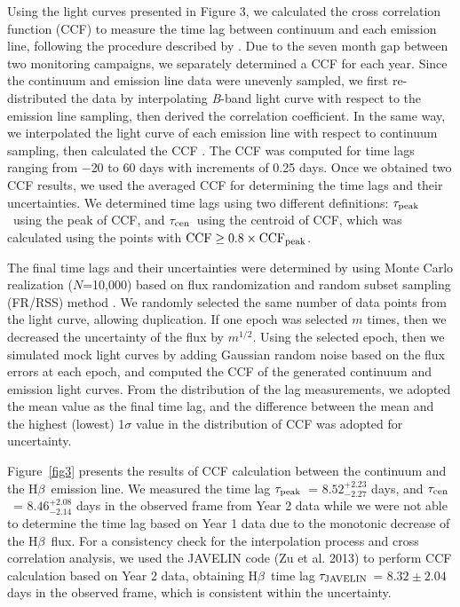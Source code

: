 \documentclass[iop]{emulateapj}
\newcommand{\Hb}{\rm H{$\beta$}}
\newcommand{\lagcen}{$\tau_{\rm cen}$}
\newcommand{\lagpeak}{$\tau_{\rm peak}$}
\begin{document}
Using the light curves presented in Figure 3, we calculated the cross correlation function (CCF) to measure the time lag between continuum and each emission line, following the procedure described by \citet{Peterson2004}. Due to the seven month gap between two monitoring campaigns, we separately determined a CCF for each year. Since the continuum and emission line data were unevenly sampled, we first re-distributed the data by interpolating \textit{B}-band light curve with respect to the emission line sampling, then derived the correlation coefficient.
In the same way, we interpolated the light curve of each emission line with respect to continuum sampling, then calculated the CCF \citep{GaskellPeterson1987,WhitePeterson1994,Peterson2004}. The CCF was computed for time lags ranging from $-$20 to 60 days with increments of 0.25 days. Once we obtained two CCF results, we used the averaged CCF for determining the time lags and their uncertainties.
We determined time lags using two different definitions: \lagpeak\ using the peak of CCF, and \lagcen\ using the centroid of CCF, which was calculated using the points with $\rm CCF \geq 0.8 \times CCF_{\rm peak}$. 

The final time lags and their uncertainties were determined by using Monte Carlo realization ($N$=10,000) based on flux randomization and random subset sampling (FR/RSS) method \citep{GaskellPeterson1987,WhitePeterson1994,Peterson2004}. We randomly selected the same number of data points from the light curve, allowing duplication. If one epoch was selected $m$ times, then we decreased the uncertainty 
of the flux by $m^{1/2}$. Using the selected epoch, then we simulated mock light curves by adding Gaussian random noise based on the flux errors at each epoch, and computed the CCF of the generated continuum and emission light curves. 
From the distribution of the lag measurements, we adopted the mean value as the final time lag, and the difference between the mean and the highest (lowest) 1$\sigma$ value in the distribution of CCF was adopted for uncertainty.

Figure~\ref{fig3} presents the results of CCF calculation between the continuum and the \Hb\ emission line. We measured the time lag  \lagpeak\ = $8.52^{+2.23}_{-2.27}$ days, and \lagcen\ = $8.46^{+2.08}_{-2.14}$ days in the observed frame from Year 2 data while we were not able to determine the time lag based on Year 1 data due to the monotonic decrease of the \Hb\ flux. 
For a consistency check for the interpolation process and cross correlation analysis, we used the JAVELIN code (Zu et al. 2013) to perform CCF calculation based on Year 2 data, obtaining \Hb\ time lag $\tau_{\rm JAVELIN}$ = $8.32 \pm 2.04 $ days in the observed frame, which is consistent within the uncertainty. 
\end{document}
